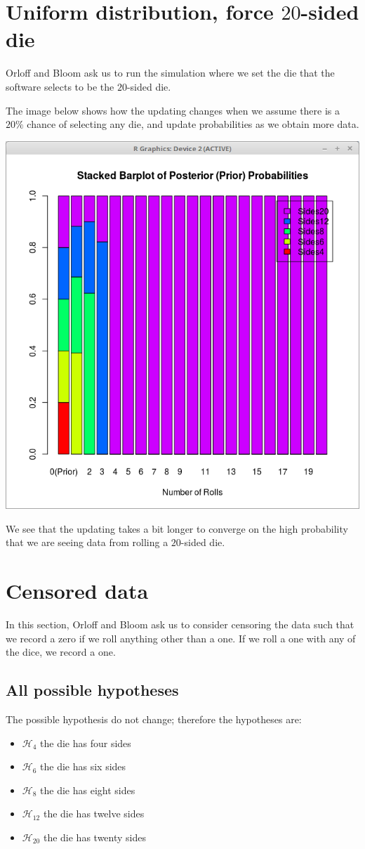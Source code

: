 \documentclass[a5paper,11pt]{article}
\begin{document}
\section{Uniform distribution, force $20$-sided die}
Orloff and Bloom ask us to run the simulation where we set the die that
the software selects to be the $20$-sided die.

The image below shows how the updating changes when we assume there is a
$20\%$ chance of selecting any die, and update probabilities as we obtain
more data.

\includegraphics[scale=0.5]{force-20.png}

We see that the updating takes a bit longer to converge on the high probability
that we are seeing data from rolling a $20$-sided die.

\section{Censored data}
In this section, Orloff and Bloom ask us to consider censoring the data 
such that we record a zero if we roll anything other than a one.  If
we roll a one with any of the dice, we record a one.

\subsection{All possible hypotheses}
The possible hypothesis do not change; therefore the hypotheses are:
\begin{itemize}
\item $\mathcal{H}_4$ the die has four sides
\item $\mathcal{H}_6$ the die has six sides
\item $\mathcal{H}_8$ the die has eight sides
\item $\mathcal{H}_{12}$ the die has twelve sides
\item $\mathcal{H}_{20}$ the die has twenty sides
\end{itemize}
\end{document}
